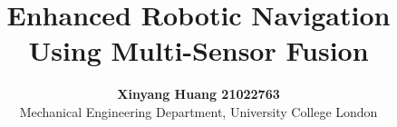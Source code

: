 \documentclass[11pt]{article}
\title{\fontsize{16pt}{19pt}\selectfont\textbf{Enhanced Robotic Navigation Using Multi-Sensor Fusion}}
\author{\fontsize{14pt}{17pt}\selectfont\textbf{Xinyang Huang 21022763} \\
\fontsize{12pt}{14pt}\selectfont Mechanical Engineering Department, University College London}
\date{} %
\begin{document}
\maketitle




\setlength{\columnsep}{1.27cm}
\begin{multicols}{2}












\printbibliography
\end{multicols}
\end{document}
